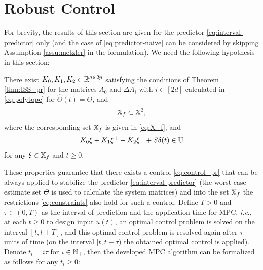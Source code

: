 \documentclass[letterpaper, 10 pt, conference]{ieeeconf}  %
\begin{document}
\section{\label{sec:control} Robust Control}

For brevity, the results of this section are given for the predictor
\eqref{eq:interval-predictor} only (and the case of \eqref{eq:predictor-naive}
can be considered by skipping Assumption \ref{assu:metzler} in the
formulation). We need the following hypothesis in this section:
\begin{assumption}
\label{assu:ctrl} There exist $K_{0},K_{1},K_{2}\in\mathbb{R}^{q\times2p}$
satisfying the conditions of Theorem \ref{thm:ISS_pr} for the matrices
$A_{0}$ and $\Delta A_{i}$ with $i\in[2d]$ calculated in \eqref{eq:polytope}
for $\hat{\Theta}(t)=\Theta$, and
\[
\mathbb{X}_{f}\subset\mathbb{X}^{2},
\]
where the corresponding set $\mathbb{X}_{f}$ is given in \eqref{eq:X_f},
and
\[
K_{0}\xi+K_{1}\xi^{+}+K_{2}\xi^{-}+S\delta(t)\in\mathbb{U}
\]
for any $\xi\in\mathbb{X}_{f}$ and $t\geq0$.
\end{assumption}
These properties guarantee that there exists a control \eqref{eq:control_pr}
that can be always applied to stabilize the predictor \eqref{eq:interval-predictor}
(the worst-case estimate set $\Theta$ is used to calculate the system
matrices) and into the set $\mathbb{X}_{f}$ the restrictions \eqref{eq:constraints}
also hold for such a control. Define $T>0$ and $\tau\in(0,T)$ as the interval of prediction and
the application time for MPC, \emph{i.e}., at each $t\geq0$ to design
input $u(t)$, an optimal control problem is solved on the interval
$[t,t+T]$, and this optimal control problem is resolved again
after $\tau$ units of time (on the interval $[t,t+\tau)$ the obtained
optimal control is applied). Denote $t_{i}=i\tau$ for $i\in\mathbb{N}_{+}$,
then the developed MPC algorithm can be formalized as follows for
any $t_{i}\geq0$:
\end{document}
